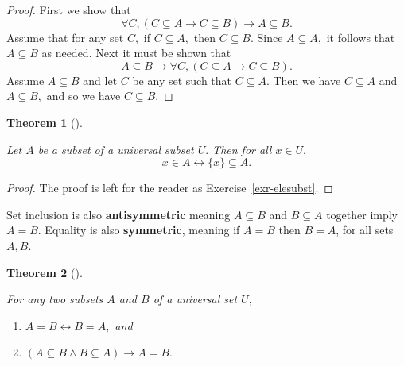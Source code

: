 \documentclass[
  letterpaper,
  10pt,
  reqno,
  twopage,
  openany]{book}
\providecommand{\tightlist}{%
  \setlength{\itemsep}{0pt}\setlength{\parskip}{0pt}}\usepackage{longtable,booktabs,array}
\theoremstyle{plain}
\theoremstyle{definition}
\theoremstyle{definition}
\theoremstyle{definition}
\theoremstyle{plain}
\theoremstyle{plain}
\newtheorem{theorem}{Theorem}[chapter]
\theoremstyle{remark}
\begin{document}
\begin{proof}

First we show that \begin{equation}
\forall C, (C\subseteq A\rightarrow C\subseteq B)\rightarrow A\subseteq B.
\end{equation} Assume that for any set \(C,\) if \(C\subseteq A,\) then
\(C\subseteq B.\) Since \(A\subseteq A,\) it follows that
\(A\subseteq B\) as needed. Next it must be shown that \begin{equation}
A\subseteq B \rightarrow \forall C, (C\subseteq A \rightarrow C\subseteq B).
\end{equation} Assume \(A\subseteq B\) and let \(C\) be any set such
that \(C\subseteq A.\) Then we have \(C\subseteq A\) and
\(A\subseteq B,\) and so we have \(C\subseteq B.\)

\end{proof}

\leavevmode{}%
\begin{theorem}[]\label{thm-elesubst}

Let \(A\) be a subset of a universal subset \(U.\) Then for all
\(x\in U,\) \begin{equation}
\label{elesubst}
x\in A \leftrightarrow \{x\}\subseteq A.
\end{equation}

\end{theorem}

\begin{proof}

The proof is left for the reader as Exercise~\ref{exr-elesubst}.

\end{proof}

Set inclusion is also  \textbf{antisymmetric}
meaning \(A\subseteq B\) and \(B\subseteq A\) together imply \(A=B\).
Equality is also  \textbf{symmetric}, meaning if
\(A=B\) then \(B=A\), for all sets \(A, B\).

\leavevmode{}%
\begin{theorem}[]\label{thm-aasym}

For any two subsets \(A\) and \(B\) of a universal set \(U,\)

\begin{enumerate}
\def\labelenumi{\arabic{enumi}.}
\tightlist
\item
  \(A=B \leftrightarrow B=A,\) and
\item
  \((A\subseteq B \land B\subseteq A) \rightarrow A=B.\)
\end{enumerate}

\end{theorem}
\end{document}
